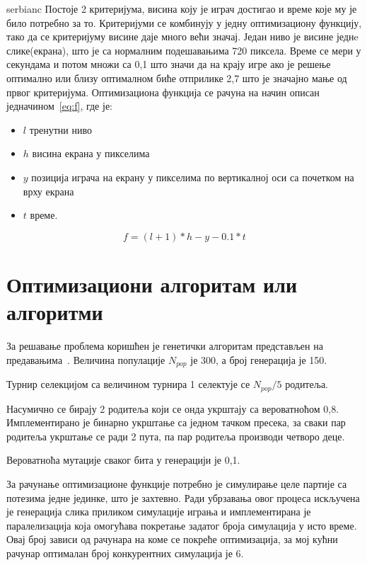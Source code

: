 \documentclass{article}
\begin{document}
\begin{otherlanguage*}{serbianc}
Постоје 2 критеријума, висина коју је играч достигао и време које му је било
потребно за то.
Критеријуми се комбинују у једну оптимизациону функцију, тако да се критеријуму
висине даје много већи значај. Један ниво је висине једнe слике(екрана), што је са
нормалним подешавањима 720 пиксела.
Време се мери у секундама и потом множи са 0,1 што значи да на крају игре ако
је решење оптимално или близу оптималном биће отприлике 2,7 што је значајно
мање од првог критеријума.
Оптимизациона функција се рачуна на начин описан једначином~\ref{eq:f},
где је:
\begin{itemize}
    \item $l$  тренутни ниво
    \item $h$  висина екрана у пикселима
    \item $y$  позиција играча на екрану у пикселима по вертикалној оси са почетком на врху екрана
    \item $t$  време.
\end{itemize}

\begin{equation}
    \label{eq:f}
    f = (l+1) * h - y - 0.1 * t
\end{equation}



\section{Оптимизациони алгоритам или алгоритми}
За решавање проблема коришћен је генетички алгоритам представљен на предавањима~\cite{predavanja}.
Величина популације $N_{pop}$ је 300, а број генерација је 150.

Турнир селекцијом са величином турнира 1 селектује се $N_{pop}/{5}$ родитеља.

Насумично се бирају 2 родитеља који се онда укрштају са
вероватноћом 0,8.
Имплементирано је бинарно укрштање са једном тачком пресека, за сваки пар
родитеља укрштање се ради 2 пута, па пар родитеља производи четворо деце.

Вероватноћа мутације сваког бита у генерацији је 0,1.

За рачунање оптимизационе функције потребно је симулирање целе партије
са потезима једне јединке, што је захтевно.
Ради убрзавања овог процеса искључена је
генерација слика приликом симулације играња и
имплементирана је паралелизација која омогућава покретање
задатог броја симулација у исто време. Овај број зависи од рачунара
на коме се покреће оптимизација, за мој кућни рачунар оптималан број
конкурентних симулација је 6.


\end{otherlanguage*}
\end{document}
